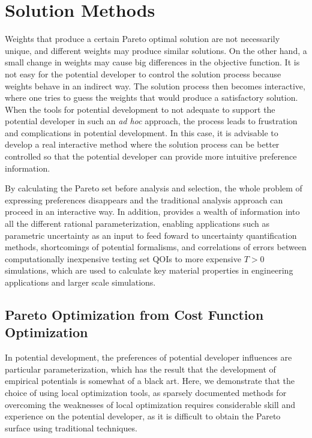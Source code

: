 \section{Solution Methods}
Weights that produce a certain Pareto optimal solution are not necessarily unique, and different weights may produce similar solutions.  On the other hand, a small change in weights may cause big differences in the objective function.  It is not easy for the potential developer to control the solution process because weights behave in an indirect way.  The solution process then becomes interactive, where one tries to guess the weights that would produce a satisfactory solution.  When the tools for potential development to not adequate to support the potential developer in such an \emph{ad hoc} approach, the process leads to frustration and complications in potential development.  In this case, it is advisable to develop a real interactive method where the solution process can be better controlled so that the potential developer can provide more intuitive preference information.

By calculating the Pareto set before analysis and selection, the whole problem of expressing preferences disappears and the traditional analysis approach can proceed in an interactive way.  In addition, provides a wealth of information into all the different rational parameterization, enabling applications such as parametric uncertainty as an input to feed foward to uncertainty quantification methods, shortcomings of potential formalisms, and correlations of errors between computationally inexpensive testing set QOIs to more expensive $T>0$ simulations, which are used to calculate key material properties in engineering applications and larger scale simulations.

\subsection{Pareto Optimization from Cost Function Optimization}

In potential development, the preferences of potential developer influences are particular parameterization, which has the result that the development of empirical potentials is somewhat of a black art.  Here, we demonstrate that the choice of using local optimization tools, as sparsely documented methods for overcoming the weaknesses of local optimization requires considerable skill and experience on the potential developer, as it is difficult to obtain the Pareto surface using traditional techniques.

